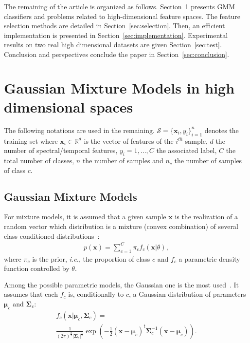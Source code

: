 \documentclass[journal,10pt]{IEEEtran}
\begin{document}
The     remaining    of     the     article     is    organized     as
follows.   Section~\ref{sec:gmm-hd}  presents   GMM  classifiers   and
problems  related to  high-dimensional  feature  spaces. The  feature
selection methods are detailed in Section~\ref{sec:selection}. Then, an
efficient         implementation        is         presented        in
Section~\ref{sec:implementation}.  Experimental  results on  two  real
high dimensional datasets are given Section~\ref{sec:test}. Conclusion
and perspectives conclude the paper in Section~\ref{sec:conclusion}.

\section{Gaussian Mixture Models in high dimensional spaces}
\label{sec:gmm-hd}

The    following    notations    are   used    in    the    remaining.
$\mathcal{S}  = \{\mathbf{x}_i,y_i\}_{i=1}^{n}$  denotes the  training
set where $\mathbf{x}_i \in \mathbb{R}^d$ is the vector of features of
the  $i^{th}$ sample,  $d$  the number  of spectral/temporal  features,
$y_i = 1,...,C$ the associated label, $C$ the total number of classes,
$n$ the  number of samples  and $n_c$ the  number of samples  of class
$c$.

    \subsection{Gaussian Mixture Models}

    For mixture models, it is assumed  that a given sample $\mathbf{x}$ is
    the realization  of a  random vector which  distribution is  a mixture
    (convex     combination)     of      several     class     conditioned
    distributions~\cite{Fraley00model-basedclustering}:
    \begin{align}
        p(\mathbf{x}) = \sum_{c=1}^{C} \pi_c f_c(\mathbf{x}|\theta),
    \end{align}
    where $\pi_c$ is  the prior, \emph{i.e.}, the  proportion of class
    $c$  and  $f_c$  a  parametric density  function  controlled by
    $\theta$.

    Among the possible parametric models,  the Gaussian one is the most
    used~\cite{bouveyron2014model}.   It assumes  that each  $f_c$ is,
    conditionally  to  $c$,  a  Gaussian  distribution  of  parameters
    $\boldsymbol{\mu}_c$    and    $\boldsymbol{\Sigma}_c$:
    \begin{multline}
        f_c(\mathbf{x}|\boldsymbol{\mu}_c, \boldsymbol{\Sigma}_c) = \\ \frac{1}{(2\pi)^{\frac{d}{2}} |\boldsymbol{\Sigma}_c|^{\frac{1}{2}}} \exp \left( -\frac{1}{2} (\mathbf{x} - \boldsymbol{\mu}_c)^t \boldsymbol{\Sigma}_c^{-1} (\mathbf{x} - \boldsymbol{\mu}_c) \right).
    \end{multline}
\end{document}
